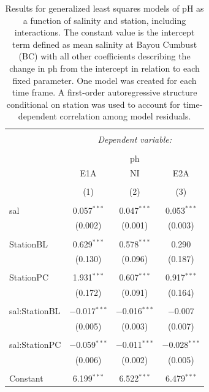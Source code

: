 \documentclass[letterpaper,12pt]{article}\usepackage[]{graphicx}\usepackage[]{color}
\begin{document}
\begin{table}[!htbp] \centering 
  \caption{Results for generalized least squares models of pH as a function of salinity and station, including interactions.  The constant value is the intercept term defined as mean salinity at Bayou Cumbust (BC) with all other coefficients describing the change in ph from the intercept in relation to each fixed parameter.  One model was created for each time frame.  A first-order autoregressive structure conditional on station was used to account for time-dependent correlation among model residuals.} 
  \label{} 
\begin{tabular}{@{\extracolsep{5pt}}lccc} 
\\[-1.8ex]\hline 
\hline \\[-1.8ex] 
 & \multicolumn{3}{c}{\textit{Dependent variable:}} \\ 
\cline{2-4} 
\\[-1.8ex] & \multicolumn{3}{c}{ph} \\ 
 & E1A & NI & E2A \\ 
\\[-1.8ex] & (1) & (2) & (3)\\ 
\hline \\[-1.8ex] 
 sal & 0.057$^{***}$ & 0.047$^{***}$ & 0.053$^{***}$ \\ 
  & (0.002) & (0.001) & (0.003) \\ 
  & & & \\ 
 StationBL & 0.629$^{***}$ & 0.578$^{***}$ & 0.290 \\ 
  & (0.130) & (0.096) & (0.187) \\ 
  & & & \\ 
 StationPC & 1.931$^{***}$ & 0.607$^{***}$ & 0.917$^{***}$ \\ 
  & (0.172) & (0.091) & (0.164) \\ 
  & & & \\ 
 sal:StationBL & $-$0.017$^{***}$ & $-$0.016$^{***}$ & $-$0.007 \\ 
  & (0.005) & (0.003) & (0.007) \\ 
  & & & \\ 
 sal:StationPC & $-$0.059$^{***}$ & $-$0.011$^{***}$ & $-$0.028$^{***}$ \\ 
  & (0.006) & (0.002) & (0.005) \\ 
  & & & \\ 
 Constant & 6.199$^{***}$ & 6.522$^{***}$ & 6.479$^{***}$ \\ 

\end{tabular}
\end{table}
\end{document}
